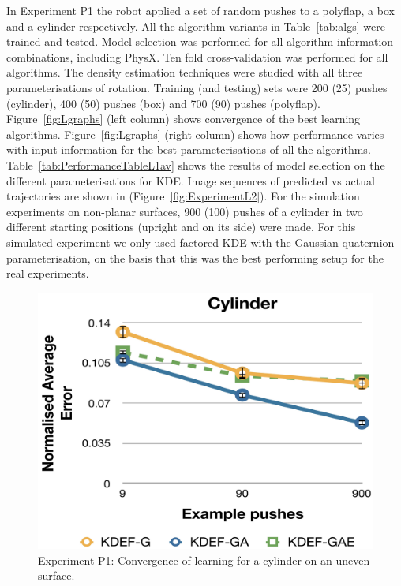 In Experiment P1 the robot applied a set of random pushes to a
polyflap, a box and a cylinder respectively. All the algorithm
variants in Table~\ref{tab:algs} were trained and tested. Model
selection was performed for all algorithm-information combinations, including PhysX. Ten fold cross-validation was performed for all algorithms. The density estimation techniques were studied with all three parameterisations of rotation. Training (and testing) sets were 200 (25) pushes (cylinder), 400 (50) pushes (box) and 700 (90) pushes (polyflap). Figure~\ref{fig:Lgraphs} (left column) shows convergence of the best learning algorithms. Figure~\ref{fig:Lgraphs} (right column) shows how performance varies with input information for the best parameterisations of all the algorithms. Table~\ref{tab:PerformanceTableL1av} shows the results of model selection on the different parameterisations for KDE. Image sequences of predicted vs actual trajectories are shown in (Figure~\ref{fig:ExperimentL2}). For the simulation experiments on non-planar surfaces, 900 (100) pushes of a cylinder in two different starting positions (upright and on its side) were made. For this simulated experiment we only used factored KDE  with the Gaussian-quaternion parameterisation, on the basis that this was the best performing setup for the real experiments. 

\begin{figure}[t]
\centerline{
\includegraphics[width=0.9\columnwidth]{./L1av-graph-cyl-sim}
}
\vspace{-1mm}
\caption{Experiment P1: Convergence of learning for a cylinder on an uneven surface. \label{fig:Lgraph-uneven}}
\end{figure}

